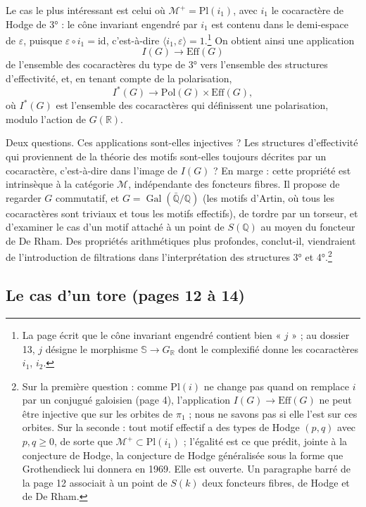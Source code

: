 \documentclass[11pt,a4paper]{article}
\begin{document}
Le cas le plus intéressant est celui où $\mathcal{M}^{+} =
\mathrm{Pl}(i_{1})$, avec $i_{1}$ le cocaractère de Hodge de 3° : le cône
invariant engendré par $i_{1}$ est contenu dans le demi-espace de
$\varepsilon$, puisque $\varepsilon \circ i_{1} = \mathrm{id}$, c'est-à-dire
$\langle i_{1}, \varepsilon\rangle = 1$.\footnote{La page écrit que le cône
invariant engendré contient bien « $j$ » ; au dossier 13, $j$ désigne le
morphisme $\mathbb{S} \to G_{\mathbb{R}}$ dont le complexifié donne les
cocaractères $i_{1}$, $i_{2}$.} On obtient ainsi une application
\[
I(G) \longrightarrow \mathrm{Eff}(G)
\]
de l'ensemble des cocaractères du type de 3° vers l'ensemble des structures
d'effectivité, et, en tenant compte de la polarisation,
\[
I^{*}(G) \longrightarrow \mathrm{Pol}(G) \times \mathrm{Eff}(G) ,
\]
où $I^{*}(G)$ est l'ensemble des cocaractères qui définissent une
polarisation, modulo l'action de $G(\mathbb{R})$.

Deux questions. Ces applications sont-elles injectives ? Les structures
d'effectivité qui proviennent de la théorie des motifs sont-elles toujours
décrites par un cocaractère, c'est-à-dire dans l'image de $I(G)$ ? En marge :
cette propriété est intrinsèque à la catégorie $\mathcal{M}$, indépendante des
foncteurs fibres. Il propose de regarder $G$ commutatif, et $G =
\operatorname{Gal}(\bar{\mathbb{Q}}/\mathbb{Q})$ (les motifs d'Artin,
où tous les cocaractères sont triviaux et tous les motifs effectifs), de
tordre par un torseur, et d'examiner le cas d'un motif attaché à un point de
$S(\mathbb{Q})$ au moyen du foncteur de De Rham. Des propriétés arithmétiques
plus profondes, conclut-il, viendraient de l'introduction de filtrations dans
l'interprétation des structures 3° et 4°.\footnote{Sur la première question :
comme $\mathrm{Pl}(i)$ ne change pas quand on remplace $i$ par un conjugué
galoisien (page 4), l'application $I(G) \to \mathrm{Eff}(G)$ ne peut être
injective que sur les orbites de $\pi_{1}$ ; nous ne savons pas si elle l'est
sur ces orbites. Sur la seconde : tout motif effectif a des types de Hodge
$(p, q)$ avec $p, q \geqslant 0$, de sorte que $\mathcal{M}^{+} \subset
\mathrm{Pl}(i_{1})$ ; l'égalité est ce que prédit, jointe à la conjecture de
Hodge, la conjecture de Hodge généralisée sous la forme que Grothendieck lui
donnera en 1969. Elle est ouverte. Un paragraphe barré de la page 12 associait
à un point de $S(k)$ deux foncteurs fibres, de Hodge et de De Rham.}

\subsection*{Le cas d'un tore (pages 12 à 14)}
\end{document}

